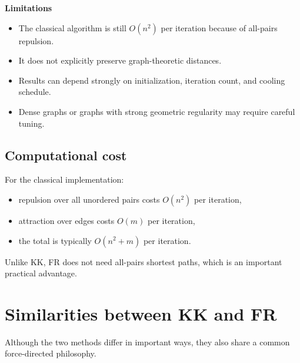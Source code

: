 \documentclass[11pt]{article}
\begin{document}
\textbf{Limitations}
\begin{itemize}[leftmargin=1.5em]
\item The classical algorithm is still $O(n^2)$ per iteration because of all-pairs repulsion.
\item It does not explicitly preserve graph-theoretic distances.
\item Results can depend strongly on initialization, iteration count, and cooling schedule.
\item Dense graphs or graphs with strong geometric regularity may require careful tuning.
\end{itemize}

\subsection{Computational cost}

For the classical implementation:
\begin{itemize}[leftmargin=1.5em]
\item repulsion over all unordered pairs costs $O(n^2)$ per iteration,
\item attraction over edges costs $O(m)$ per iteration,
\item the total is typically $O(n^2 + m)$ per iteration.
\end{itemize}

Unlike KK, FR does not need all-pairs shortest paths, which is an important
practical advantage.

\section{Similarities between KK and FR}

Although the two methods differ in important ways, they also share a common
force-directed philosophy.
\end{document}
